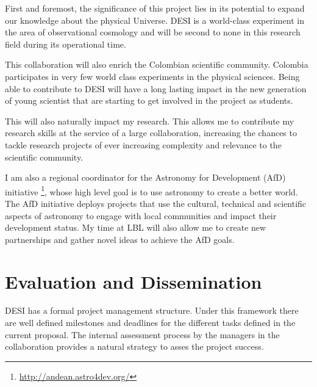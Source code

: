 \documentclass[12pt]{article}
\begin{document}
First and foremost, the significance of this project lies in its
potential to expand our knowledge about the physical Universe. DESI is
a world-class experiment in the area of observational cosmology and
will be second to none in this research field during its operational
time.  
 

This collaboration will also enrich the Colombian scientific
community. Colombia participates in very few world class experiments
in the physical sciences. Being able to contribute to DESI will have a
long lasting impact in the new generation of young scientist that are
starting to get involved in the project as students.

This will also naturally impact my research. This allows me to contribute
my research skills at the service of a large collaboration, increasing
the chances to tackle research projects of ever increasing complexity
and relevance to the scientific community.



I am also a regional coordinator for the Astronomy for
Development (AfD)
initiative \footnote{\url{http://andean.astro4dev.org/}}, whose high
level goal is to use astronomy to create a better world.
The AfD initiative deploys projects that use the cultural, technical
and scientific aspects of astronomy to engage with local communities
and impact their development status.  My time at LBL will also allow me to
create new partnerships and gather novel ideas to achieve the AfD goals.



\section*{Evaluation and Dissemination}


DESI has a formal project management structure. 
Under this framework there are well defined milestones
and deadlines for the different tasks defined in the current
proposal. The internal assessment process by the managers in the
collaboration provides a natural strategy to asses the project success.  
\end{document}
